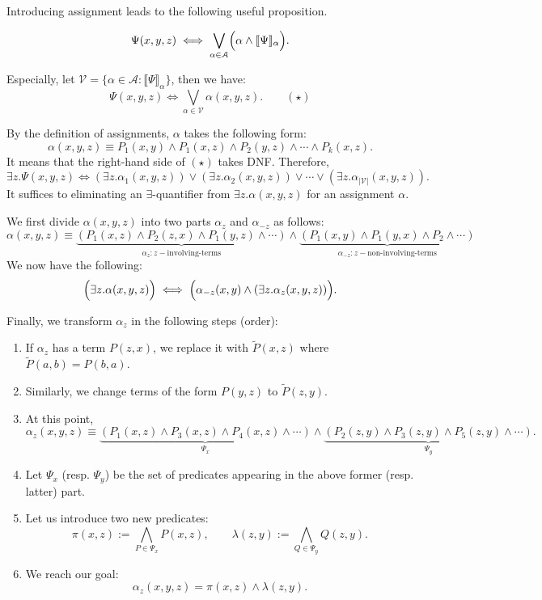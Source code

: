 \documentclass[a4paper,UKenglish,cleveref, autoref, thm-restate]{lipics-v2021}
\newcommand{\sem}[1]{\llbracket #1 \rrbracket}
\newcommand{\set}[1]{\{ #1 \}}
\begin{document}
Introducing assignment leads to the following useful proposition.
\begin{proposition}
$$
\Psi(x, y, z) \iff
\bigvee_{\alpha \in \mathcal{A}} \Bigl( \alpha \land \sem{\Psi}_{\alpha} \Bigr).
$$

Especially, let $\mathcal{V} = \set{ \alpha \in \mathcal{A} : \sem{\Psi}_\alpha }$, then we have:
$$
\Psi(x,y, z) \iff \bigvee_{\alpha \in \mathcal{V}} \alpha(x, y, z). \qquad (\star)
$$
\end{proposition}


By the definition of assignments, $\alpha$ takes the following form:
$$
\alpha(x, y, z) \equiv P_1(x, y) \land P_1(x, z) \land P_2(y, z) \land \cdots \land P_k(x, z).
$$
It means that the right-hand side of $(\star)$ takes DNF. Therefore,
$$
\exists z. \Psi(x, y, z) \iff (\exists z. \alpha_1(x, y, z)) \lor (\exists z. \alpha_2(x, y, z)) \lor \cdots \lor (\exists z. \alpha_{|\mathcal{V}|}(x, y, z)).
$$
It suffices to eliminating an $\exists$-quantifier from $\exists z. \alpha(x, y, z)$ for an assignment $\alpha$.

We first divide $\alpha(x, y, z)$ into two parts $\alpha_z$ and $\alpha_{-z}$ as follows:
$$
\alpha(x, y, z) \equiv \underbrace{(P_1(x, z) \land P_2(z, x) \land P_1(y, z) \land \cdots)}_{\alpha_z : z-\text{involving-terms}} \land \underbrace{(P_1(x, y) \land P_1(y, x) \land P_2 \land \cdots)}_{\alpha_{-z} : z-\text{non-involving-terms}}
$$
We now have the following:
$$
\Bigl(\exists z. \alpha(x, y, z)\Bigr) \iff \Bigl(\alpha_{-z}(x, y) \land (\exists z. \alpha_z(x, y, z))\Bigr).
$$

Finally, we transform $\alpha_z$ in the following steps (order):
\begin{enumerate}
\item If $\alpha_z$ has a term $P(z, x)$, we replace it with $\widetilde{P}(x, z)$ where $\widetilde{P}(a, b) = P(b, a)$.
\item Similarly, we change terms of the form $P(y, z)$ to $\widetilde{P}(z, y)$.
\item At this point, 
$$
\alpha_z(x, y, z) \equiv \underbrace{(P_1(x, z) \land P_3(x, z) \land P_4(x, z) \land \cdots)}_{\Psi_x} \land \underbrace{(P_2(z, y) \land P_3(z, y) \land P_5(z, y) \land \cdots)}_{\Psi_y}.
$$
\item Let $\Psi_x$ (resp. $\Psi_y$) be the set of predicates appearing in the above former (resp. latter) part.
\item Let us introduce two new predicates:
$$
\pi(x, z) := \bigwedge_{P \in \Psi_x} P(x, z), \qquad
\lambda(z, y) := \bigwedge_{Q \in \Psi_y} Q(z, y).
$$
\item We reach our goal:
$$
\alpha_z(x, y, z) = \pi(x, z) \land \lambda(z, y).
$$
\end{enumerate}
\end{document}
